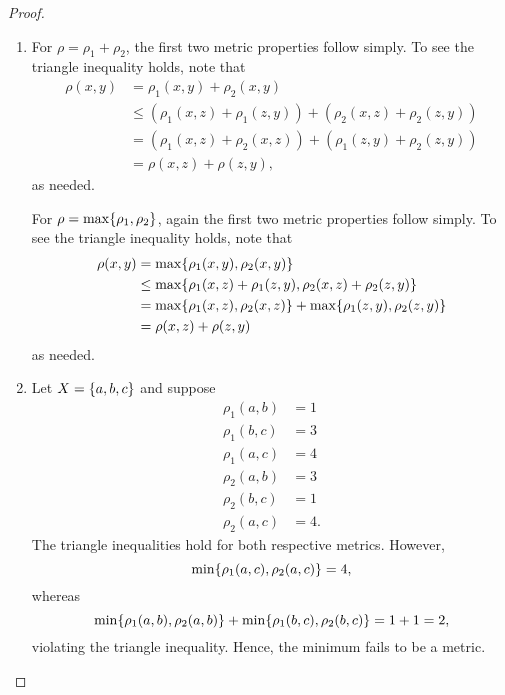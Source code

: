 \begin{proof}
    \begin{enumerate}
        \item For $\rho = \rho_1 + \rho_2$, the first two metric properties
            follow simply. To see the triangle inequality holds, note that
            \begin{align*}
                \rho(x,y) &= \rho_1(x,y) + \rho_2(x,y) \\
                &\leq \left( \rho_1(x,z) + \rho_1(z,y) \right) + \left(
                \rho_2(x,z) + \rho_2(z,y)
                \right) \\
                &= \left( \rho_1(x,z) + \rho_2(x,z) \right) + \left( \rho_1(z,y)
                + \rho_2(z,y)
                \right) \\
                &= \rho(x,z) + \rho(z,y),
            \end{align*}
            as needed.

            For $\rho = \max\{\rho_1, \rho_2\}$, again the first two metric
            properties follow simply. To see the triangle inequality holds, note
            that
            \begin{align*}
                \rho(x,y) &= \max \{\rho_1(x,y), \rho_2(x, y)\}  \\
                &\leq \max \{\rho_1(x,z)+\rho_1(z,y), \rho_2(x, z)+\rho_2(z,
                y)\}  \\
                &= \max\{\rho_1(x,z), \rho_2(x,z)\} + \max\{\rho_1(z,y),
                \rho_2(z,y)\} \\
                &= \rho(x,z) + \rho(z,y)
            \end{align*}
            as needed.
        \item Let $X = \{a,b,c\}$ and suppose
            \begin{align*}
                \rho_1(a,b) &= 1 \\
                \rho_1(b,c) &= 3 \\
                \rho_1(a,c) &= 4 \\
                \rho_2(a,b) &= 3 \\
                \rho_2(b,c) &= 1 \\
                \rho_2(a,c) &= 4.
            \end{align*}
            The triangle inequalities hold for both respective metrics. However,
            \[
                \min\{\rho_1(a,c), \rho_2(a,c)\} = 4,
            \]
            whereas
            \[
                \min\{\rho_1(a,b), \rho_2(a,b)\} + \min\{\rho_1(b,c),
                \rho_2(b,c)\} = 1 + 1 = 2,
            \]
            violating the triangle inequality. Hence, the minimum fails to be a
            metric.


\end{enumerate}
\end{proof}
